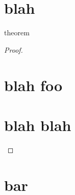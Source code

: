 \documentclass[11pt]{article}
\begin{document}
\section{blah}
\begin{thm}
    theorem
\end{thm}

\begin{proof}
    \section{blah foo}
    \section{blah blah}
\end{proof}
\section{bar}
\end{document}
